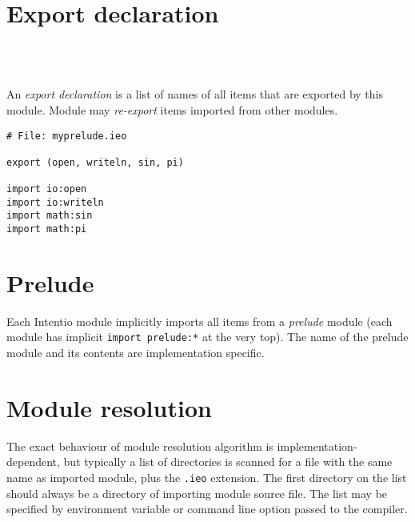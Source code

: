 \section{Export declaration}

\begin{bnf}
   \eq {} \ \term{(} \  \ \term{)} \\
   \eq {} \  \ \gtry{\term{,}}
\end{bnf}

An \emph{export declaration} is a list of names of all items that are exported by this module. Module may \emph{re-export} items imported from other modules.

\begin{example}[Re-exporting]
\begin{lstlisting}
# File: myprelude.ieo

export (open, writeln, sin, pi)

import io:open
import io:writeln
import math:sin
import math:pi
\end{lstlisting}
\end{example}

\section{Prelude}

Each Intentio module implicitly imports all items from a \emph{prelude} module (each module has implicit \lstinline{import prelude:*} at the very top). The name of the prelude module and its contents are implementation specific.

\section{Module resolution}

The exact behaviour of module resolution algorithm is implementation-dependent, but typically a list of directories is scanned for a file with the same name as imported module, plus the \lstinline{.ieo} extension. The first directory on the list should always be a directory of importing module source file. The list may be specified by environment variable or command line option passed to the compiler.
